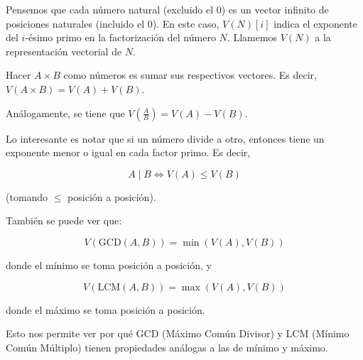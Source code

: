 Pensemos que cada número natural (excluido %
el 0) es un vector infinito de posiciones %
naturales (incluido el 0). En este caso, %
$V(N)[i]$ indica el exponente del $i$-ésimo %
primo en la factorización del número $N$. %
Llamemos $V(N)$ a la representación %
vectorial de $N$. %

Hacer $A \times B$ como números es %
sumar sus respectivos vectores. Es decir, %
$V(A \times B) = V(A) + V(B)$. %

Análogamente, se tiene que %
$V\left(\frac{A}{B}\right) = V(A) - V(B)$. %

Lo interesante es notar que si un número %
divide a otro, entonces tiene un exponente %
menor o igual en cada factor primo. Es %
decir, %

$$A \mid B \iff V(A) \leq V(B)$$ %

(tomando $\leq$ posición a posición). %

También se puede ver que: %

$$V(\text{GCD}(A,B)) = \min(V(A), V(B))$$ %

donde el mínimo se toma posición a %
posición, y %

$$V(\text{LCM}(A,B)) = \max(V(A), V(B))$$ %

donde el máximo se toma posición a %
posición. %

Esto nos permite ver por qué GCD %
(Máximo Común Divisor) y LCM (Mínimo %
Común Múltiplo) tienen propiedades %
análogas a las de mínimo y máximo. %